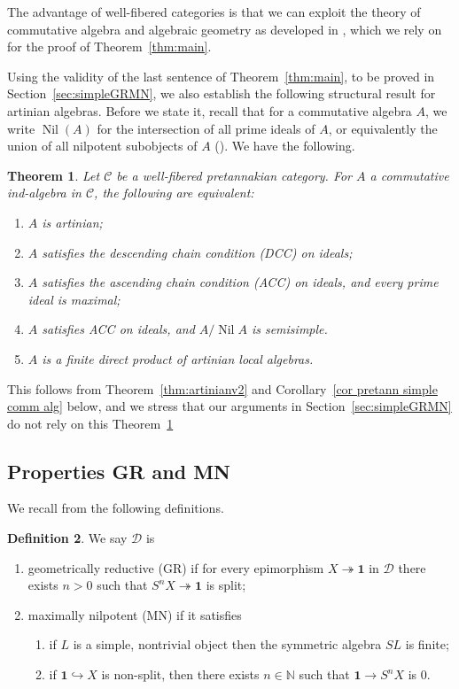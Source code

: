 \documentclass[11pt]{amsart}
\def\N{\mathbb{N}}
\def\Cs{\mathscr{C}}
\def\Ds{\mathscr{D}}
\def\onto{\twoheadrightarrow}
\newtheorem{thm}{Theorem}[section]
\theoremstyle{definition}
\newtheorem{definition}[thm]{Definition}
\theoremstyle{remark}
\numberwithin{equation}{section}
\begin{document}
The advantage of well-fibered categories is that we can exploit the theory of commutative algebra and algebraic geometry as developed in \cite{C1, C2, CS}, which we rely on for the proof of Theorem~\ref{thm:main}.

Using the validity of the last sentence of Theorem~\ref{thm:main}, to be proved in Section~\ref{sec:simpleGRMN}, we also establish the following structural result for artinian algebras. Before we state it, recall that for a commutative algebra $A$, we write $\operatorname{Nil}(A)$ for the intersection of all prime ideals of $A$, or equivalently the union of all nilpotent subobjects of $A$ (\cite[\S2.2.4]{C1}).  We have the following.

\begin{thm}\label{thm artin comm rings GRMN} Let $\Cs$ be a well-fibered pretannakian category.
    For $A$ a commutative ind-algebra in $\Cs$, the following are equivalent:
    \begin{enumerate}
        \item $A$ is artinian;
        \item $A$ satisfies the descending chain condition (DCC) on ideals;
        \item $A$ satisfies the ascending chain condition (ACC) on ideals, and every prime ideal is maximal;
        \item $A$ satisfies ACC on ideals, and $A/\operatorname{Nil}A$ is semisimple.
        \item $A$ is a finite direct product of artinian local algebras.
    \end{enumerate}
\end{thm}

This follows from Theorem~\ref{thm:artinianv2} and Corollary~\ref{cor pretann simple comm alg} below, and we stress that our arguments in  Section~\ref{sec:simpleGRMN} do not rely on this Theorem~\ref{thm artin comm rings GRMN}



\subsection{Properties GR and MN}We recall from \cite{C1} the following definitions.

\begin{definition}
    We say $\Ds$ is 
    \begin{enumerate}
        \item geometrically reductive (GR) if for every epimorphism $X\onto\mathbf{1}$ in $\Ds$ there exists $n>0$ such that $S^nX\onto\mathbf{1}$ is split;
        \item maximally nilpotent (MN) if it satisfies 
        \begin{enumerate}
            \item[(i)] if $L$ is a simple, nontrivial object then the symmetric algebra $SL$ is finite;
            \item[(ii)] if $\mathbf{1}\hookrightarrow X$ is non-split, then there exists $n\in\N$ such that $\mathbf{1}\to S^nX$ is 0.
        \end{enumerate}
    \end{enumerate}
\end{definition}
\end{document}
